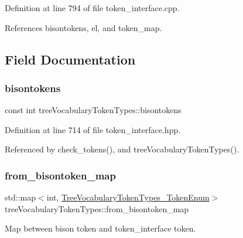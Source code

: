 Definition at line 794 of file token\+\_\+interface.\+cpp.



References bisontokens, el, and token\+\_\+map.



\subsection{Field Documentation}
\mbox{\label{structtreeVocabularyTokenTypes_af84fcf1475941be9f0cc17dc45d60a70}} 
\subsubsection{\texorpdfstring{bisontokens}{bisontokens}}
{\footnotesize\ttfamily const int tree\+Vocabulary\+Token\+Types\+::bisontokens\hspace{0.3cm}{\ttfamily [static]}}



Definition at line 714 of file token\+\_\+interface.\+hpp.



Referenced by check\+\_\+tokens(), and tree\+Vocabulary\+Token\+Types().

\mbox{\label{structtreeVocabularyTokenTypes_a3e052c179911e90bec55b71035deb620}} 
\subsubsection{\texorpdfstring{from\+\_\+bisontoken\+\_\+map}{from\_bisontoken\_map}}
{\footnotesize\ttfamily std\+::map$<$int, \hyperlink{token__interface_8hpp_a14502d0757789149f644966ca931b126}{Tree\+Vocabulary\+Token\+Types\+\_\+\+Token\+Enum}$>$ tree\+Vocabulary\+Token\+Types\+::from\+\_\+bisontoken\+\_\+map}



Map between bison token and token\+\_\+interface token. 



